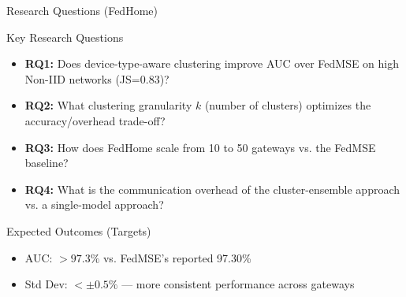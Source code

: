 \documentclass[10pt, aspectratio=169]{beamer}
\begin{document}
\begin{frame}{Research Questions (FedHome)}
    \begin{block}{Key Research Questions}
        \begin{itemize}
            \item \textbf{RQ1:} Does device-type-aware clustering improve AUC over FedMSE on high Non-IID networks (JS=0.83)?
            \item \textbf{RQ2:} What clustering granularity $k$ (number of clusters) optimizes the accuracy/overhead trade-off?
            \item \textbf{RQ3:} How does FedHome scale from 10 to 50 gateways vs. the FedMSE baseline?
            \item \textbf{RQ4:} What is the communication overhead of the cluster-ensemble approach vs. a single-model approach?
        \end{itemize}
    \end{block}
    
    \vspace{0.5cm}
    
    \begin{alertblock}{Expected Outcomes (Targets)}
        \begin{itemize}
            \item AUC: $> 97.3\%$ vs. FedMSE's reported 97.30\%
            \item Std Dev: $< \pm 0.5\%$ — more consistent performance across gateways
        \end{itemize}
    \end{alertblock}
\end{frame}
\end{document}
